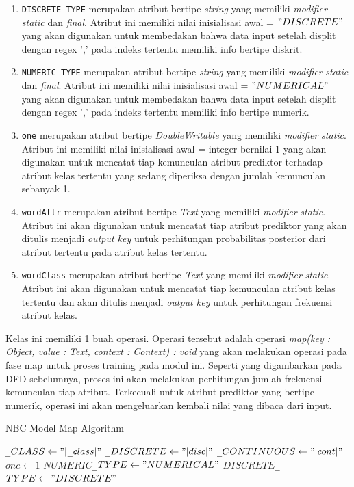 \begin{enumerate}
\begin{enumerate}
		\item \verb|DISCRETE_TYPE| merupakan atribut bertipe \textit{string} yang memiliki \textit{modifier} \textit{static} dan \textit{final}. Atribut ini memiliki nilai inisialisasi awal = $"DISCRETE"$ yang akan digunakan untuk membedakan bahwa data input setelah displit dengan regex ',' pada indeks tertentu memiliki info bertipe diskrit.
		\item \verb|NUMERIC_TYPE| merupakan atribut bertipe \textit{string} yang memiliki \textit{modifier} \textit{static} dan \textit{final}. Atribut ini memiliki nilai inisialisasi awal = $"NUMERICAL"$ yang akan digunakan untuk membedakan bahwa data input setelah displit dengan regex ',' pada indeks tertentu memiliki info bertipe numerik.
		\item \verb|one| merupakan atribut bertipe \textit{DoubleWritable} yang memiliki \textit{modifier} \textit{static}. Atribut ini memiliki nilai inisialisasi awal = integer bernilai 1 yang akan digunakan untuk mencatat tiap kemunculan atribut prediktor terhadap atribut kelas tertentu yang sedang diperiksa dengan jumlah kemunculan sebanyak 1.
		\item \verb|wordAttr| merupakan atribut bertipe \textit{Text} yang memiliki \textit{modifier} \textit{static}. Atribut ini akan digunakan untuk mencatat tiap atribut prediktor yang akan ditulis menjadi \textit{output key} untuk perhitungan probabilitas posterior dari atribut tertentu pada atribut kelas tertentu.
		\item \verb|wordClass| merupakan atribut bertipe \textit{Text} yang memiliki \textit{modifier} \textit{static}. Atribut ini akan digunakan untuk mencatat tiap kemunculan atribut kelas tertentu dan akan ditulis menjadi \textit{output key} untuk perhitungan frekuensi atribut kelas.
	\end{enumerate}
	Kelas ini memiliki 1 buah operasi. Operasi tersebut adalah operasi \textit{map(key : Object, value : Text, context : Context) : void} yang akan melakukan operasi pada fase map untuk proses training pada modul ini. Seperti yang digambarkan pada DFD sebelumnya, proses ini akan melakukan perhitungan jumlah frekuensi kemunculan tiap atribut. Terkecuali untuk atribut prediktor yang bertipe numerik, operasi ini akan mengeluarkan kembali nilai yang dibaca dari input.
	
\begin{algorithm}[H]
\caption{NBC Model Map Algorithm}\label{alg:NBCGenMap}
\begin{algorithmic}[1]
\State $ $\verb|_|$CLASS \gets "|$\verb|_|$class|"$
\State $ $\verb|_|$DISCRETE \gets "|disc|"$
\State $ $\verb|_|$CONTINUOUS \gets "|cont|"$
\State $ one \gets 1$
\State $ NUMERIC$\verb|_|$TYPE \gets "NUMERICAL"$
\State $ DISCRETE$\verb|_|$TYPE \gets "DISCRETE"$


\end{algorithmic}
\end{algorithm}
\end{enumerate}
